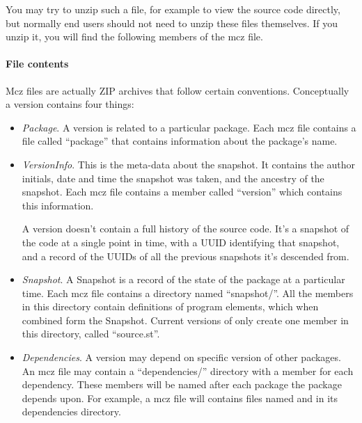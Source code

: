 \documentclass[a4paper,10pt,twoside]{book}
\begin{document}


You may try to unzip such a file, for example to view the source code directly, but normally end users should not need to unzip these files themselves.
If you unzip it, you will find the following members of the mcz file.

\paragraph{File contents}
Mcz files are actually ZIP archives that follow certain conventions. Conceptually a version contains four things:

\begin{itemize}
\item \emph{Package}. A version is related to a particular package. Each mcz file contains a file called ``package'' that contains information about the package's name.

\item \emph{VersionInfo}. This is the meta-data about the snapshot. It contains the author initials, date and time the snapshot was taken, and the ancestry of the snapshot. Each mcz file contains a member called ``version'' which contains this information.

A version doesn't contain a full history of the source code. It's a snapshot of the code at a single point in time, with a UUID identifying that snapshot, and a record of the UUIDs of all the previous snapshots it's descended from.

\item \emph{Snapshot}. A Snapshot is a record of the state of the package at a particular time. Each mcz file contains a directory named ``snapshot/''. All the members in this directory contain definitions of program elements, which when combined form the Snapshot. Current versions of \MC only create one member in this directory, called ``source.st''.

\item \emph{Dependencies}. A version may depend on specific version of other packages. An mcz file may contain a ``dependencies/'' directory with a member for each dependency. These members will be named after each package the \MC package depends upon. For example, a  mcz file will contains files named  and  in its dependencies directory.
\end{itemize}
\end{document}
